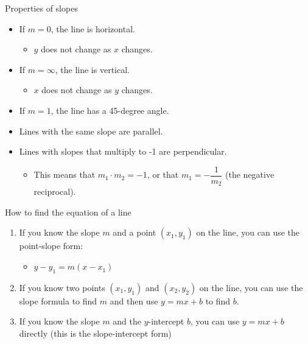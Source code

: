\documentclass[
  10pt,
  ignorenonframetext,
]{beamer}
\providecommand{\tightlist}{%
  \setlength{\itemsep}{0pt}\setlength{\parskip}{0pt}}\usepackage{longtable,booktabs,array}
\begin{document}
\begin{frame}{Properties of slopes}
\label{properties-of-slopes}
\begin{itemize}
\item
  If \(m = 0\), the line is horizontal.

  \begin{itemize}
  \tightlist
  \item
    \(y\) does not change as \(x\) changes.
  \end{itemize}
\item
  If \(m = \infty\), the line is vertical.

  \begin{itemize}
  \tightlist
  \item
    \(x\) does not change as \(y\) changes.
  \end{itemize}
\item
  If \(m = 1\), the line has a 45-degree angle.
\item
  Lines with the same slope are parallel.
\item
  Lines with slopes that multiply to -1 are perpendicular.

  \begin{itemize}
  \tightlist
  \item
    This means that \(m_1 \cdot m_2 = -1\), or that
    \(m_1 = -\dfrac{1}{m_2}\) (the negative reciprocal).
  \end{itemize}
\end{itemize}
\end{frame}

\begin{frame}{How to find the equation of a line}
\label{how-to-find-the-equation-of-a-line}
\begin{enumerate}
\item
  If you know the slope \(m\) and a point \((x_1, y_1)\) on the line,
  you can use the point-slope form:

  \begin{itemize}
  \tightlist
  \item
    \(y - y_1 = m(x - x_1)\)
  \end{itemize}
\item
  If you know two points \((x_1, y_1)\) and \((x_2, y_2)\) on the line,
  you can use the slope formula to find \(m\) and then use
  \(y = mx + b\) to find \(b\).
\item
  If you know the slope \(m\) and the \(y\)-intercept \(b\), you can use
  \(y = mx + b\) directly (this is the slope-intercept form)
\end{enumerate}
\end{frame}
\end{document}
